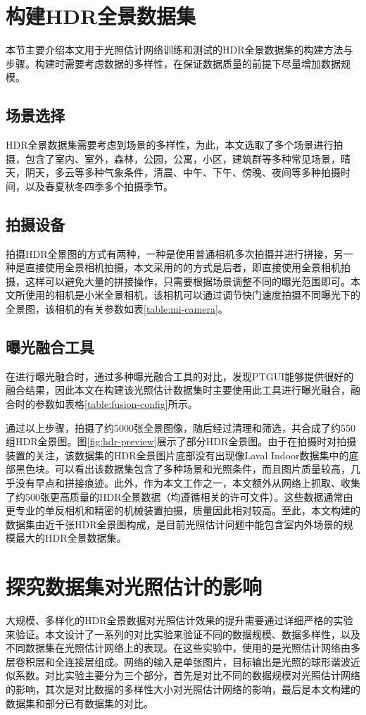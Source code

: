 \section{构建HDR全景数据集}
本节主要介绍本文用于光照估计网络训练和测试的HDR全景数据集的构建方法与步骤。构建时需要考虑数据的多样性，在保证数据质量的前提下尽量增加数据规模。
\subsection{场景选择}
HDR全景数据集需要考虑到场景的多样性，为此，本文选取了多个场景进行拍摄，包含了室内、室外，森林，公园，公寓，小区，建筑群等多种常见场景，晴天，阴天，多云等多种气象条件，清晨、中午、下午、傍晚、夜间等多种拍摄时间，以及春夏秋冬四季多个拍摄季节。
\subsection{拍摄设备}
拍摄HDR全景图的方式有两种，一种是使用普通相机多次拍摄并进行拼接，另一种是直接使用全景相机拍摄，本文采用的的方式是后者，即直接使用全景相机拍摄，这样可以避免大量的拼接操作，只需要根据场景调整不同的曝光范围即可。本文所使用的相机是小米全景相机\cite{xiaomi}，该相机可以通过调节快门速度拍摄不同曝光下的全景图，该相机的有关参数如表\ref{table:mi-camera}。

\subsection{曝光融合工具}
在进行曝光融合时，通过多种曝光融合工具的对比，发现PTGUI\cite{ptgui}能够提供很好的融合结果，因此本文在构建该光照估计数据集时主要使用此工具进行曝光融合，融合时的参数如表格\ref{table:fusion-config}所示。


通过以上步骤，拍摄了约5000张全景图像，随后经过清理和筛选，共合成了约550组HDR全景图。图\ref{fig:hdr-preview}展示了部分HDR全景图。由于在拍摄时对拍摄装置的关注，该数据集的HDR全景图片底部没有出现像Laval Indoor数据集\cite{gardner2017learning}中的底部黑色块。可以看出该数据集包含了多种场景和光照条件，而且图片质量较高，几乎没有早点和拼接痕迹。此外，作为本文工作之一，本文额外从网络上抓取、收集了约500张更高质量的HDR全景数据（均遵循相关的许可文件）。这些数据通常由更专业的单反相机和精密的机械装置拍摄，质量因此相对较高。至此，本文构建的数据集由近千张HDR全景图构成，是目前光照估计问题中能包含室内外场景的规模最大的HDR全景数据集。

\section{探究数据集对光照估计的影响}
大规模、多样化的HDR全景数据对光照估计效果的提升需要通过详细严格的实验来验证。本文设计了一系列的对比实验来验证不同的数据规模、数据多样性，以及不同数据集在光照估计网络上的表现。在这些实验中，使用的是光照估计网络由多层卷积层和全连接层组成。网络的输入是单张图片，目标输出是光照的球形谐波近似系数。对比实验主要分为三个部分，首先是对比不同的数据规模对光照估计网络的影响，其次是对比数据的多样性大小对光照估计网络的影响，最后是本文构建的数据集和部分已有数据集的对比。

